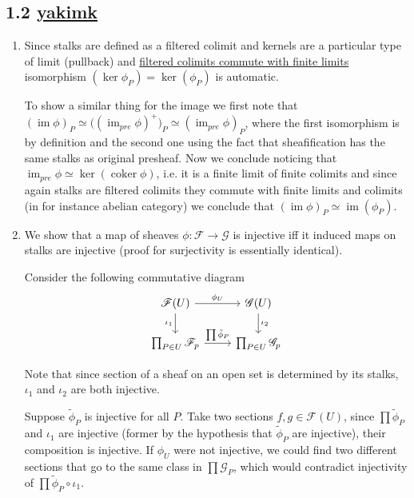     \subsection*{1.2   \href{https://github.com/yakimk}{yakimk}
}

\begin{enumerate}
    \item Since stalks are defined as a filtered colimit and kernels are a particular type of limit (pullback) and \href{https://stacks.math.columbia.edu/tag/002W}{filtered colimits commute with finite limits} isomorphism $(\ker \phi_{P}) = \ker(\phi_{P})$ is automatic.

To show a similar thing for the image we first note that $(\operatorname{im}\phi)_{P} \simeq ({(\operatorname{im}_{pre}\phi)^{+})_{P}}\simeq (\operatorname{im}_{pre} \phi)_{P}$, where the first isomorphism is by definition and the second one using the fact that sheafification has the same stalks as original presheaf.  Now we conclude noticing that $\operatorname{im}_{pre}\phi \simeq \ker(\operatorname{coker}\phi)$, i.e. it is a finite limit of finite colimits and since again stalks are filtered colimits they commute with finite limits and colimits (in for instance abelian category) we conclude that $(\operatorname{im} \phi)_{P} \simeq \operatorname{im}(\phi_{P})$.

\item We show that a map of sheaves $\phi: \mathscr{F} \to \mathscr{G}$ is injective iff it induced maps on stalks are injective (proof for surjectivity is essentially identical).

Consider the following commutative diagram
\[
\begin{tikzcd}
\mathscr{F}(U)     \arrow[r,"\phi_{U}"] \arrow[d,"\iota _{1}"'] &  \mathscr{G}(U) \arrow[d,"\iota_{2}"]\\ 
\prod_{P \in U} \mathscr{F}_{p}     \arrow[r,"\prod \tilde{\phi }_{P}"] &  \prod_{P \in U}\mathscr{G}_{p}
\end{tikzcd}
\]

Note that since section of a sheaf on an open set is determined by its stalks, $\iota_{1}$ and $\iota_{2}$ are both injective.

Suppose $\tilde{\phi}_{P}$ is injective for all $P$. Take two sections $f, g \in \mathscr{F}(U)$, since $\prod \tilde{\phi}_{P}$ and $\iota_{1}$ are injective (former by the hypothesis that $\tilde{\phi}_{P}$ are injective), their composition is injective. If $\phi_{U}$ were not injective, we could find two different sections that go to the same class in $\prod \mathscr{G}_{P}$, which would contradict injectivity of $\prod \tilde{\phi}_{P} \circ \iota_{1}$.


\end{enumerate}
